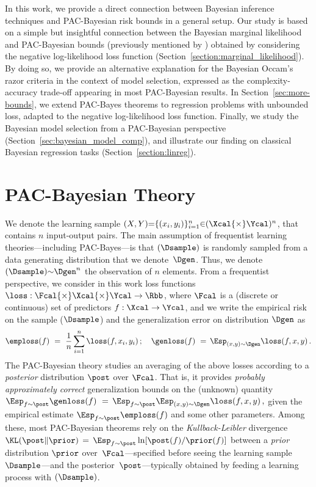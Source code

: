 \documentclass{article}
\theoremstyle{definition}
\theoremstyle{plain}
\begin{document}
In this work, we provide a direct connection between Bayesian inference techniques \citep[summarized by][]{bishop-2006,zoubin-15} and PAC-Bayesian risk bounds in a general setup.
Our study is based on a simple but insightful connection between the Bayesian marginal likelihood and PAC-Bayesian bounds (previously mentioned by \citet{grunwald-2012}) obtained by considering the negative log-likelihood loss function (Section~\ref{section:marginal_likelihood}). By doing so, we provide an alternative explanation for the Bayesian Occam's razor criteria  \citep{jeffreys-92,mackay-92} in the  context of model selection, expressed as the complexity-accuracy trade-off appearing in most PAC-Bayesian results. In Section~\ref{sec:more-bounds}, we extend PAC-Bayes theorems to regression problems with unbounded loss, adapted to the negative log-likelihood loss function. Finally, we study the Bayesian model selection from a PAC-Bayesian perspective (Section~\ref{sec:bayesian_model_comp}), and illustrate our finding on classical Bayesian regression tasks (Section~\ref{section:linreg}).
%

%
%
%
%
%
%


\section{PAC-Bayesian Theory}

\newcommand{\fcmt}[1]{\red{\footnote{\blue{#1}}}}
\newcommand{\cmt}[1]{\blue{\small{#1}}}

%
We denote the learning sample 
%
$(X,Y){=}\{(x_i,y_i)\}_{i=1}^n{\in}(\Xcal{\times}\Ycal)^n$, 
that contains $n$ input-output pairs. 
The main assumption of frequentist learning theories---including PAC-Bayes---is that $(\Dsample)$ is randomly sampled from a data generating distribution that we denote~$\Dgen$. 
%
Thus, we denote $(\Dsample){\sim}\Dgen^n$ the \iid observation of $n$ elements.
From a frequentist perspective, we consider in this work loss functions  $\loss:\Fcal{\times}\Xcal{\times}\Ycal\to\Rbb$,
%
where $\Fcal$ is a (discrete or continuous) set of predictors $f:\Xcal\to\Ycal$, and we write the empirical risk on the sample ($\Dsample$) and the generalization error on  distribution $\Dgen$ as
\begin{equation*}
\emploss(f)
\ = \ \frac1n \sum_{i=1}^n  \loss(f, x_i,y_i) \,;
\quad
%
\genloss(f)
\ = \, \Esp_{(x,y)\sim\Dgen} \loss(f, x,y) 
\,.
\end{equation*} 
The PAC-Bayesian theory \citep{mcallester-99,mcallester-03a} studies an averaging of the above losses according to a \emph{posterior} distribution $\post$ over  $\Fcal$. That is, it provides \emph{probably approximately correct} generalization bounds on the (unknown) quantity
%
$\Esp_{f\sim\post} \genloss(f)
\ = \, \Esp_{f\sim\post}  \Esp_{(x,y)\sim\Dgen} \loss(f, x,y) 
\,,$
%
given the empirical estimate  $\Esp_{f\sim\post} \emploss(f)$ and some other parameters. Among these, most PAC-Bayesian theorems rely on the \emph{Kullback-Leibler} divergence 
%
$\KL(\post\|\prior) \, = \, \Esp_{f\sim\post} \ln [\post(f) / \prior(f)]$ 
between a \emph{prior} distribution $\prior$ over~$\Fcal$---specified before seeing the learning sample $\Dsample$---and the posterior~$\post$---typically obtained by feeding a learning process with $(\Dsample)$. 
\end{document}
